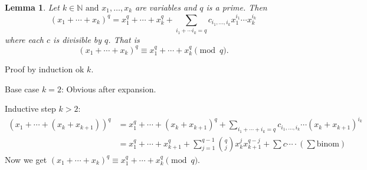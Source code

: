 \documentclass[11pt]{article}
\newtheorem{lemma}[thm]{Lemma}
\theoremstyle{definition}
\newcommand{\srng}[3]{#1_#2,\dots,#1_#3}
\newcommand{\et}[0]{\text{ and }}
\newcommand{\NN}{\mathbb{N}}
\begin{document}
\begin{lemma}
	Let $k\in\NN \et \srng{x}{1}{k}$ are variables and $q$ is a prime. 
	Then
	$$ (x_1 + \cdots + x_k)^q = x_1^q + \cdots + x_k^q + \sum_{i_1 + \cdots i_k = q} c_{i_1,...,i_k} x_1^{i_1} \cdots x_k^{i_k} $$
	where each $c$ is divisible by $q$. That is
	$$ (x_1+\cdots+x_k)^q \equiv x_1^q + \cdots + x_k^q \pmod{q} . $$ 
\end{lemma}
\proof 
	Proof by induction ok $k$.

	Base case $k=2$: Obvious after expansion.

	Inductive step $k > 2$: 
	\begin{align*}
		(x_1 + \cdots + (x_k+x_{k+1}))^q 
		&= x_1^q + \cdots + (x_k+x_{k+1})^q + \sum_{i_1+\cdots+i_k=q} c_{i_1,...,i_k} \cdots (x_k + x_{k+1})^{i_k} \\
		&= x_1^q + \cdots + x_{k+1}^q + \sum_{j=1}^{q-1} \binom{q}{j} x_k^j x_{k+1}^{q-j} + \sum c \cdots \cdot \left( \sum \text{binom} \right)
	\end{align*}
	Now we get $(x_1+\cdots+x_k)^q \equiv x_1^q + \cdots + x_k^q \pmod{q}$. 
\qedhere

\end{document}
